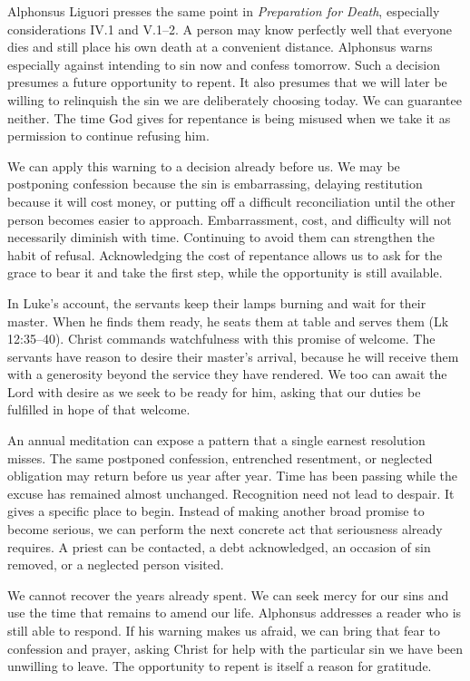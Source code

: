 Alphonsus Liguori presses the same point in \emph{Preparation for Death}, especially considerations IV.1 and V.1--2. A person may know perfectly well that everyone dies and still place his own death at a convenient distance. Alphonsus warns especially against intending to sin now and confess tomorrow. Such a decision presumes a future opportunity to repent. It also presumes that we will later be willing to relinquish the sin we are deliberately choosing today. We can guarantee neither. The time God gives for repentance is being misused when we take it as permission to continue refusing him.

We can apply this warning to a decision already before us. We may be postponing confession because the sin is embarrassing, delaying restitution because it will cost money, or putting off a difficult reconciliation until the other person becomes easier to approach. Embarrassment, cost, and difficulty will not necessarily diminish with time. Continuing to avoid them can strengthen the habit of refusal. Acknowledging the cost of repentance allows us to ask for the grace to bear it and take the first step, while the opportunity is still available.

In Luke's account, the servants keep their lamps burning and wait for their master. When he finds them ready, he seats them at table and serves them (Lk 12:35--40). Christ commands watchfulness with this promise of welcome. The servants have reason to desire their master's arrival, because he will receive them with a generosity beyond the service they have rendered. We too can await the Lord with desire as we seek to be ready for him, asking that our duties be fulfilled in hope of that welcome.

An annual meditation can expose a pattern that a single earnest resolution misses. The same postponed confession, entrenched resentment, or neglected obligation may return before us year after year. Time has been passing while the excuse has remained almost unchanged. Recognition need not lead to despair. It gives a specific place to begin. Instead of making another broad promise to become serious, we can perform the next concrete act that seriousness already requires. A priest can be contacted, a debt acknowledged, an occasion of sin removed, or a neglected person visited.

We cannot recover the years already spent. We can seek mercy for our sins and use the time that remains to amend our life. Alphonsus addresses a reader who is still able to respond. If his warning makes us afraid, we can bring that fear to confession and prayer, asking Christ for help with the particular sin we have been unwilling to leave. The opportunity to repent is itself a reason for gratitude.

